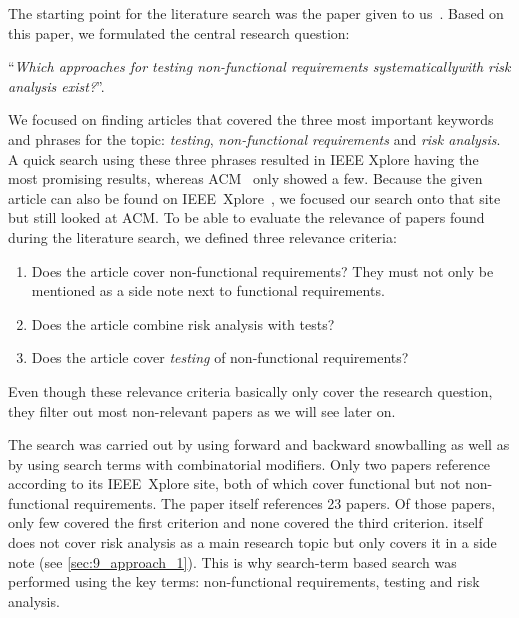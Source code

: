 The starting point for the literature search was the paper given to us~\cite{ZouPavlovski2008}.
Based on this paper, we formulated the central research question: 

\hspace*{0.5cm}\enquote{\textit{Which approaches for testing non-functional requirements systematically\newline \hspace*{0.7cm}with risk analysis exist?}}.

We focused on finding articles that covered the three most important keywords and phrases for the topic: \textit{testing}, \textit{non-functional requirements} and \textit{risk analysis}.
A quick search using these three phrases resulted in IEEE Xplore having the most promising results, whereas ACM~\cite{acm} only showed a few.
Because the given article \cite{ZouPavlovski2008} can also be found on IEEE~Xplore~\cite{ieee}, we focused our search onto that site but still looked at ACM.
\newpage
To be able to evaluate the relevance of papers found during the literature search, we defined three relevance criteria:

\begin{enumerate}
	\item Does the article cover non-functional requirements? They must not only  be mentioned as a side note next to functional requirements.
	\item Does the article combine risk analysis with tests?
	\item Does the article cover \textit{testing} of non-functional requirements?
\end{enumerate}

Even though these relevance criteria basically only cover the research question, they filter out most non-relevant papers as we will see later on.

The search was carried out by using forward and backward snowballing as well as by using search terms with combinatorial modifiers.
Only two papers reference \cite{ZouPavlovski2008} according to its IEEE~Xplore site, both of which cover functional but not non-functional requirements.
The paper itself references 23 papers.
Of those papers, only few covered the first criterion and none covered the third criterion.
\cite{ZouPavlovski2008} itself does not cover risk analysis as a main research topic but only covers it in a side note (see \autoref{sec:9_approach_1}).
This is why search-term based search was performed using the key terms: non-functional requirements, testing and risk analysis.

